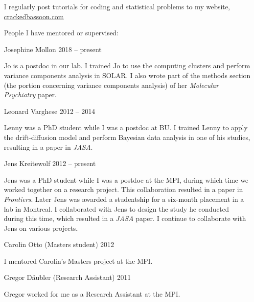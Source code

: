 \documentclass[10pt]{article}
\makeatletter
\newlength{\bibhang}
\newlength{\bibsep}
 {\@listi \global\bibsep\itemsep \global\advance\bibsep by\parsep}
\newenvironment{bibsection}%
        {\vspace{-\baselineskip}\begin{list}{}{%
       \setlength{\leftmargin}{\bibhang}%
       \setlength{\itemindent}{-\leftmargin}%
       \setlength{\itemsep}{\bibsep}%
       \setlength{\parsep}{\z@}%
        \setlength{\partopsep}{0pt}%
        \setlength{\topsep}{0pt}}}
        {\end{list}\vspace{-.6\baselineskip}}
\newenvironment{outerlist}[1][\enskip\textbullet]%
        {\begin{itemize}[#1]}{\end{itemize}%
         \vspace{-.6\baselineskip}}
\newenvironment{innerlist}[1][\enskip\textbullet]%
        {\begin{compactitem}[#1]}{\end{compactitem}}
\makeatother
\begin{document}
\begin{bibsection}
\item I regularly post tutorials for coding and statistical problems to my website, \href{mailto:https://crackedbassoon.com}{crackedbassoon.com}
\item People I have mentored or supervised:
\begin{outerlist}
\item[]Josephine Mollon \hfill{2018 -- present}
\begin{innerlist}\item Jo is a postdoc in our lab. I trained Jo to use the computing clusters and perform variance components analysis in SOLAR. I also wrote part of the methods section (the portion concerning variance components analysis) of her \emph{Molecular Psychiatry} paper.\end{innerlist}
\item[]Leonard Varghese \hfill{2012 -- 2014}
\begin{innerlist}\item Lenny was a PhD student while I was a postdoc at BU. I trained Lenny to apply the drift-diffusion model and perform Bayesian data analysis in one of his studies, resulting in a paper in \emph{JASA}.\end{innerlist}
\item[]Jens Kreitewolf \hfill{2012 -- present}
\begin{innerlist}\item Jens was a PhD student while I was a postdoc at the MPI, during which time we worked together on a research project. This collaboration resulted in a paper in \emph{Frontiers}. Later Jens was awarded a studentship for a six-month placement in a lab in Montreal. I collaborated with Jens to design the study he conducted during this time, which resulted in a \emph{JASA} paper. I continue to collaborate with Jens on various projects.\end{innerlist}
\item[]Carolin Otto (Masters student)  \hfill{2012}
\begin{innerlist}\item I mentored Carolin's Masters project at the MPI.\end{innerlist}
\item[]Gregor Däubler (Research Assistant) \hfill{2011}
\begin{innerlist}\item Gregor worked for me as a Research Assistant at the MPI.\end{innerlist}

\end{outerlist}
\end{bibsection}
\end{document}
